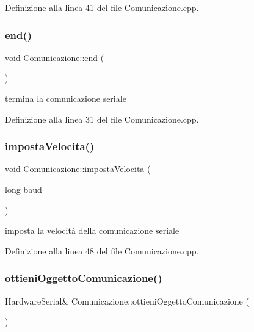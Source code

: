 Definizione alla linea 41 del file Comunicazione.\+cpp.

\mbox{\label{class_comunicazione_a1c97e95cbc279dd897fac5296250d2f5}} 
\subsubsection{\texorpdfstring{end()}{end()}}
{\footnotesize\ttfamily void Comunicazione\+::end (\begin{DoxyParamCaption}{ }\end{DoxyParamCaption})}



termina la comunicazione seriale 



Definizione alla linea 31 del file Comunicazione.\+cpp.

\mbox{\label{class_comunicazione_aaded119b9f77b77bcf214243c4b89f36}} 
\subsubsection{\texorpdfstring{imposta\+Velocita()}{impostaVelocita()}}
{\footnotesize\ttfamily void Comunicazione\+::imposta\+Velocita (\begin{DoxyParamCaption}\item[{long}]{baud }\end{DoxyParamCaption})}



imposta la velocità della comunicazione seriale 



Definizione alla linea 48 del file Comunicazione.\+cpp.

\mbox{\label{class_comunicazione_ad06d143e6030e8acd1c8f654bf5e961f}} 
\subsubsection{\texorpdfstring{ottieni\+Oggetto\+Comunicazione()}{ottieniOggettoComunicazione()}}
{\footnotesize\ttfamily Hardware\+Serial\& Comunicazione\+::ottieni\+Oggetto\+Comunicazione (\begin{DoxyParamCaption}{ }\end{DoxyParamCaption})\hspace{0.3cm}{\ttfamily [inline]}}



